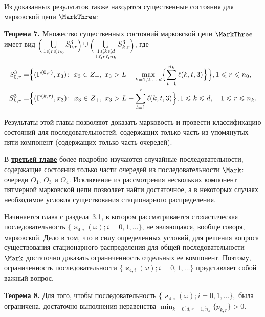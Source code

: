 Из доказанных результатов также находятся существенные состояния для марковской цепи $\MarkThree$:

\textbf{Теорема 7.}
Множество существенных состояний марковской цепи $\MarkThree$ имеет вид $\raisebox{-.5ex}{$\Bigl($}\bigcup\limits_{1 \leqslant r \leqslant n_0}S^3_{0, r}\raisebox{-.5ex}{$\Bigr)$}\cup \raisebox{-.5ex}{$\Bigl($}\bigcup\limits_{\substack{1 \leqslant k \leqslant d\\ 1 \leqslant r \leqslant n_k}} S^3_{k, r}\raisebox{-.5ex}{$\Bigr)$}$,
где
\begin{align*}
  S^3_{0, r} = & 
  \Bigl\{
  (\Gamma^{(0,  r)},  x_3) \colon \; x_3\in Z_+, \; x_3 > L - \max\limits_{k=1,  2, 
    \ldots,  d}
  \Bigl\{ \sum_{t=1}^{n_k} \ell({k,  t,  3}) \Bigl\}\Bigl\},  
   1 \leqslant r \leqslant n_0,  \\
  S^3_{k,  r} = & 
  \Bigl\{
  (\Gamma^{(k,  r)},  x_3) \colon \; x_3\in Z_+, \; x_3 > L - \sum_{t=1}^{r} \ell({k,  t,  3})
  \Bigr\},  
   1 \leqslant k \leqslant d,  \quad 1 \leqslant r \leqslant n_k.
\end{align*}

 Результаты этой главы позволяют доказать марковость и провести классификацию состояний для последовательностей,  содержащих только часть из упомянутых пяти компонент (содержащих только часть очередей).
 


В  \underline{\textbf{третьей главе}} более подробно изучаются случайные последовательности,  содержащие состояния только части очередей из последовательности $\Mark$: очереди $O_1$, $O_3$ и $O_4$. Исключение из рассмотрения нескольких компонент пятмерной марковской цепи позволяет найти достаточное, а в некоторых случаях  необходимое условия существования стационарного распределения. 

Начинается глава с раздела~3.1, в котором рассматривается стохастическая последовательность $\{\varkappa_{4, i}(\omega); i =0,  1,  \ldots\}$, не являющаяся, вообще говоря, марковской. Дело в том, что в силу определенных условий, для решения вопроса существования стационарного распределения для общей последовательности $\Mark$ достаточно доказать ограниченность отдельных ее компонент. Поэтому, ограниченность последовательности $\{\varkappa_{4, i}(\omega); i =0,  1,  \ldots\}$ представляет собой важный вопрос.

\textbf{Теорема 8.}
Для того,  чтобы последовательность 
$
\{\varkappa_{4, i}(\omega); i =0,  1,  \ldots\}, 
$ была ограничена,  достаточно выполнения неравенства
$
    \min_{k=\overline{0, d},  r=\overline{1, n_k}} {\{p_{k, r}\}} > 0.
$

